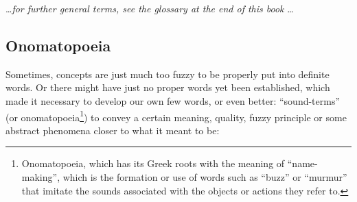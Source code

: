 \vspace{5pt}

\noindent \ldots \textit{for further general terms, see the glossary at the end of this book} \ldots

\subsection{Onomatopoeia}\label{subsec:onomatopoeia}

Sometimes, concepts are just much too fuzzy to be properly put into definite words.
Or there might have just no proper words yet been established, which made it necessary to develop our own few words, or even better: ``sound-terms'' (or onomatopoeia\footnote{Onomatopoeia, which has its Greek roots with the meaning of ``name-making'', which is the formation or use of words such as ``buzz'' or ``murmur'' that imitate the sounds associated with the objects or actions they refer to.}) to convey a certain meaning, quality, fuzzy principle or some abstract phenomena closer to what it meant to be:

